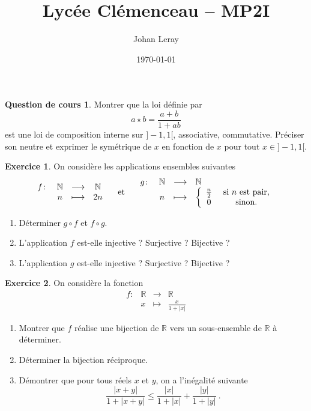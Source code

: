 \documentclass[12pt,a4paper]{amsart}
\title{Lycée Clémenceau -- MP2I}
\date{\today}
\author{Johan Leray}
\theoremstyle{definition}
\newtheorem*{question}{\sc Question de cours}
\newtheorem{exercice}{\sc Exercice}[section]
\newcommand{\N}{\mathbb{N}}
\newcommand{\R}{\mathbb{R}}
\newcommand{\too}{\longrightarrow}
\newcommand{\mapstoo}{\longmapsto}
\begin{document}
\thispagestyle{empty}

\section{}
\subsection{}

\begin{question}
	Montrer que la loi définie par 
	\[
		a \star b = \frac{a+b}{1+ab} 
	\]
	est une loi de composition interne sur $]-1,1[$, associative, commutative. Préciser son neutre et exprimer le symétrique de $x$ en fonction de $x$ pour tout $x\in ]-1,1[$.
\end{question}


\begin{exercice}
	On considère les applications ensembles suivantes 
	\[
		\begin{array}[]{rccc}
			f \colon & \N & \too & \N \\
			& n & \mapstoo & 2n
		\end{array}
		\quad 
		\mbox{ et }
		\quad 
		\begin{array}[]{rccl}
			g \colon & \N & \too & \N \\
			& n & \mapstoo & 
			\left\{ 
				\begin{array}{cc}
					\frac{n}{2} & \mbox{ si $n$ est pair,} \\
					0 & \mbox{ sinon.}
				\end{array}
			\right.
		\end{array}
	\]
	\begin{enumerate}
		\item Déterminer $g\circ f$ et $f\circ g$.
		\item L'application $f$ est-elle injective ? Surjective ? Bijective ?
		\item L'application $g$ est-elle injective ? Surjective ? Bijective ?
	\end{enumerate}
\end{exercice}

\begin{exercice}
	On considère la fonction  
	\[
		\begin{array}{rccc}
			f \colon & \R & \too & \R \\
			& x & \mapstoo & \frac{x}{1 + |x|}
		\end{array}
	\]
	\begin{enumerate}
		\item Montrer que $f$ réalise une bijection de $\R$ vers un sous-ensemble de $\R$ à déterminer.
		\item Déterminer la bijection réciproque.
		\item Démontrer que pour tous réels $x$ et $y$, on a l'inégalité suivante
		\[
			\frac{|x+y|}{1 +|x+y|} \leqslant \frac{|x|}{1+|x|} + \frac{|y|}{1+|y|} \ .
		\]
	\end{enumerate}
\end{exercice}
\end{document}
